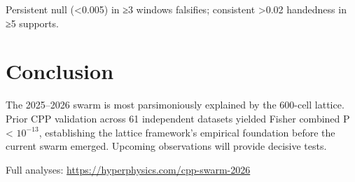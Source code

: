 \documentclass[11pt]{article}
\begin{document}
Persistent null (<0.005) in ≥3 windows falsifies; consistent >0.02 handedness in ≥5 supports.

\section{Conclusion}
The 2025--2026 swarm is most parsimoniously explained by the 600-cell lattice. Prior CPP validation across 61 independent datasets yielded Fisher combined P < $10^{-13}$, establishing the lattice framework's empirical foundation before the current swarm emerged. Upcoming observations will provide decisive tests.

Full analyses: \url{https://hyperphysics.com/cpp-swarm-2026}
\end{document}

